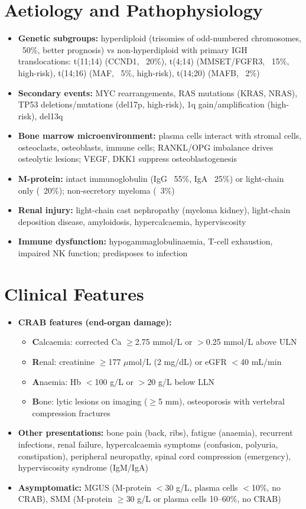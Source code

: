 \section*{Aetiology and Pathophysiology}
\begin{itemize}
    \item \textbf{Genetic subgroups:} hyperdiploid (trisomies of odd-numbered chromosomes, ~50\%, better prognosis) vs non-hyperdiploid with primary IGH translocations: t(11;14) (CCND1, ~20\%), t(4;14) (MMSET/FGFR3, ~15\%, high-risk), t(14;16) (MAF, ~5\%, high-risk), t(14;20) (MAFB, ~2\%)
    \item \textbf{Secondary events:} MYC rearrangements, RAS mutations (KRAS, NRAS), TP53 deletions/mutations (del17p, high-risk), 1q gain/amplification (high-risk), del13q
    \item \textbf{Bone marrow microenvironment:} plasma cells interact with stromal cells, osteoclasts, osteoblasts, immune cells; RANKL/OPG imbalance drives osteolytic lesions; VEGF, DKK1 suppress osteoblastogenesis
    \item \textbf{M-protein:} intact immunoglobulin (IgG ~55\%, IgA ~25\%) or light-chain only (~20\%); non-secretory myeloma (~3\%)
    \item \textbf{Renal injury:} light-chain cast nephropathy (myeloma kidney), light-chain deposition disease, amyloidosis, hypercalcaemia, hyperviscosity
    \item \textbf{Immune dysfunction:} hypogammaglobulinaemia, T-cell exhaustion, impaired NK function; predisposes to infection
\end{itemize}

\section*{Clinical Features}
\begin{itemize}
    \item \textbf{CRAB features (end-organ damage):}
    \begin{itemize}
        \item \textbf{C}alcaemia: corrected Ca $\ge$2.75 mmol/L or $>$0.25 mmol/L above ULN
        \item \textbf{R}enal: creatinine $\ge$177 $\mu$mol/L (2 mg/dL) or eGFR $<$40 mL/min
        \item \textbf{A}naemia: Hb $<$100 g/L or $>$20 g/L below LLN
        \item \textbf{B}one: lytic lesions on imaging ($\ge$5 mm), osteoporosis with vertebral compression fractures
    \end{itemize}
    \item \textbf{Other presentations:} bone pain (back, ribs), fatigue (anaemia), recurrent infections, renal failure, hypercalcaemia symptoms (confusion, polyuria, constipation), peripheral neuropathy, spinal cord compression (emergency), hyperviscosity syndrome (IgM/IgA)
    \item \textbf{Asymptomatic:} MGUS (M-protein $<$30 g/L, plasma cells $<$10\%, no CRAB), SMM (M-protein $\ge$30 g/L or plasma cells 10--60\%, no CRAB)
\end{itemize}

